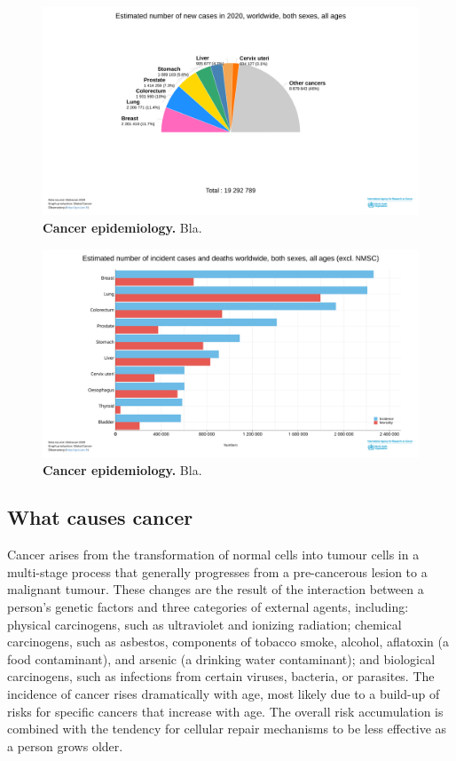 \begin{figure}[h]
    \includegraphics[width=1\textwidth]{images/intro/cancer-proportion.png}
    \centering
    \caption{ \textbf{Cancer epidemiology.} Bla. }
    \label{fig:cancer-proportion}
\end{figure}

\begin{figure}[h]
    \includegraphics[width=1\textwidth]{images/intro/cancer-incidence-mortality.png}
    \centering
    \caption{ \textbf{Cancer epidemiology.} Bla. }
    \label{fig:cancer-epidemio}
\end{figure}


\subsection{What causes cancer}

Cancer arises from the transformation of normal cells into tumour cells in a
multi-stage process that generally progresses from a pre-cancerous lesion to a
malignant tumour. These changes are the result of the interaction between a
person's genetic factors and three categories of external agents, including:
physical carcinogens, such as ultraviolet and ionizing radiation; chemical
carcinogens, such as asbestos, components of tobacco smoke, alcohol, aflatoxin
(a food contaminant), and arsenic (a drinking water contaminant); and biological
carcinogens, such as infections from certain viruses, bacteria, or parasites.
The incidence of cancer rises dramatically with age, most likely due to a
build-up of risks for specific cancers that increase with age. The overall risk
accumulation is combined with the tendency for cellular repair mechanisms to be
less effective as a person grows older.


